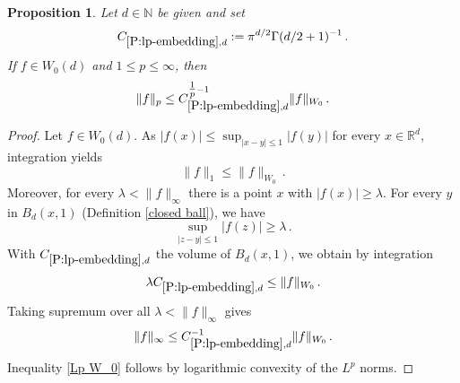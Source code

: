 \documentclass[12pt,reqno]{amsart}
\theoremstyle{plain}
\newtheorem{proposition}[theorem]{Proposition}
\numberwithin{equation}{section}
\theoremstyle{remark}
\newcommand{\uses}[1]{}
\newcommand{\usesdefs}[1]{}
\newcommand{\R}{{\mathbb R}}
\newcommand{\N}{{\mathbb N}}
\begin{document}
\begin{proposition}\label{P:lp-embedding}\uses{}\usesdefs{closed ball,auto:Wiener-space-definition}
Let $d\in \N$ be given and set
\begin{equation}\label{auto:Wiener-Lp-embedding-constant}
    C_{\ref{P:lp-embedding},d}:=\pi^{d/2}\Gamma(d/2+1)^{-1}\, .
\end{equation}
If $f\in W_0(d)$ and $1\le p\le \infty$, then
\begin{equation}\label{Lp W_0}
\|f\|_p\le C_{\ref{P:lp-embedding},d}^{\tfrac 1p -1}\|f\|_{W_0}    \, .
\end{equation}
\end{proposition}

\begin{proof}
Let $f\in W_0(d)$. As $|f(x)|\le \sup_{|x-y|\le 1}|f(y)|$ for every $x\in \R^d$, integration yields
\begin{equation}
    \|f\|_1\le \|f\|_{W_0}\, .
\end{equation}
Moreover, for every $\lambda<\|f\|_\infty$  there is a point $x$ with $|f(x)|\ge \lambda$.
For every $y$ in  $B_d(x,1)$ (Definition \ref{closed ball}), we have
\begin{equation*}
    \sup_{|z-y|\le 1}
|f(z)|\ge \lambda \, .\end{equation*}
With $C_{\ref{P:lp-embedding},d}$  the volume of  $B_d(x,1)$, we obtain by integration
\begin{equation}
    \lambda C_{\ref{P:lp-embedding},d}\le \|f\|_{W_0}\, .
\end{equation}
Taking supremum over all $\lambda<
\|f\|_\infty$ gives
\begin{equation}
    \|f\|_\infty\le C_{\ref{P:lp-embedding},d}^{-1}\|f\|_{W_0}\, .
\end{equation}
Inequality \eqref{Lp W_0} follows by logarithmic convexity of the $L^p$ norms.
\end{proof}
\end{document}

